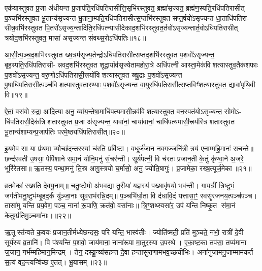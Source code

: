{\anuvakamend[{वसू॑नां भा॒गो॑ऽसि॒ षट्च॑त्वारिशच्च॥९॥}]}

एक॑यास्तुवत प्र॒जा अ॑धीयन्त प्र॒जाप॑ति॒रधि॑पतिरासीत्ति॒सृभि॑रस्तुवत॒ ब्रह्मा॑सृज्यत॒ ब्रह्म॑ण॒स्पति॒रधि॑पतिरासीत् प॒ञ्चभि॑रस्तुवत भू॒तान्य॑सृज्यन्त भू॒ताना॒म्पति॒रधि॑पतिरासीत्स॒प्तभि॑रस्तुवत सप्त॒र्\mbox{}षयो॑ऽसृज्यन्त धा॒ताधि॑पतिरा- सीन्न॒वभि॑रस्तुवत पि॒तरो॑ऽसृज्य॒न्तादि॑ति॒रधि॑पत्न्यासीदेकाद॒शभि॑रस्तुवत॒र्तवो॑ऽसृज्यन्तार्त॒वोऽधि॑पतिरासीत् त्रयोद॒शभि॑रस्तुवत॒ मासा॑ असृज्यन्त संवथ्स॒रोऽधि॑पतिः॥१८॥

आ॒सी॒त्प॒ञ्च॒द॒शभि॑रस्तुवत ख्ष॒त्रम॑सृज्य॒तेन्द्रोऽधि॑पतिरासीत्सप्तद॒शभि॑रस्तुवत प॒शवो॑ऽसृज्यन्त॒ बृह॒स्पति॒रधि॑पतिरासी- न्नवद॒शभि॑रस्तुवत शूद्रा॒र्याव॑सृज्येतामहोरा॒त्रे अधि॑पत्नी आस्ता॒मेक॑विशत्यास्तुव॒तैक॑शफाः प॒शवो॑ऽसृज्यन्त॒ वरु॒णोऽधि॑पतिरासी॒त्त्रयो॑विशत्यास्तुवत ख्षु॒द्राः प॒शवो॑ऽसृज्यन्त पू॒षाधि॑पतिरासी॒त्पञ्च॑विशत्यास्तुवतार॒ण्याः प॒शवो॑ऽसृज्यन्त वा॒युरधि॑पतिरासीत्स॒प्तविꣳ॑शत्यास्तुवत॒ द्यावा॑पृथि॒वी वि॥१९॥

ऐ॒तां॒ वस॑वो रु॒द्रा आ॑दि॒त्या अनु॒ व्या॑य॒न्तेषा॒माधि॑पत्यमासी॒न्नव॑विशत्यास्तुवत॒ वन॒स्पत॑योऽसृज्यन्त॒ सोमोऽ- धि॑पतिरासी॒देक॑त्रिशतास्तुवत प्र॒जा अ॑सृज्यन्त॒ यावा॑नां॒ चाया॑वानां॒ चाधि॑पत्यमासी॒त्त्रय॑स्त्रिशतास्तुवत भू॒तान्य॑शाम्यन्प्र॒जाप॑तिः परमे॒ष्ठ्यधि॑पतिरासीत्॥२०॥

{\anuvakamend[{सं॒ व॒थ्स॒रोऽधि॑पति॒र्वि पञ्च॑त्रिशच्च॥10॥}]}

इ॒यमे॒व सा या प्र॑थ॒मा व्यौच्छ॑द॒न्तर॒स्यां च॑रति॒ प्रवि॑ष्टा। व॒धूर्ज॑जान नव॒गज्जनि॑त्री॒ त्रय॑ एनाम्महि॒मानः॑ सचन्ते॥ छन्द॑स्वती उ॒षसा॒ पेपि॑शाने समा॒नं योनि॒मनु॑ सं॒चर॑न्ती। सूर्य॑पत्नी॒ वि च॑रतः प्रजान॒ती के॒तुं कृ॑ण्वा॒ने अ॒जरे॒ भूरि॑रेतसा॥ ऋ॒तस्य॒ पन्था॒मनु॑ ति॒स्र आगु॒स्त्रयो॑ घ॒र्मासो॒ अनु॒ ज्योति॒षागुः॑। प्र॒जामेका॒ रख्ष॒त्यूर्ज॒मेका॥२१॥

व्र॒तमेका॑ रख्षति देवयू॒नाम्॥ च॒तु॒ष्टो॒मो अ॑भव॒द्या तु॒रीया॑ य॒ज्ञस्य॑ प॒ख्षावृ॑षयो॒ भव॑न्ती। गा॒य॒त्रीं त्रि॒ष्टुभं॒ जग॑तीमनु॒ष्टुभ॑म्बृ॒हद॒र्कं यु॑ञ्जा॒नाः सुव॒राभ॑रन्नि॒दम्॥ प॒ञ्चभि॑र्धा॒ता वि द॑धावि॒दं यत्तासा॒ꣳ॒ स्वसॄ॑रजनय॒त्पञ्च॑पञ्च। तासा॑मु यन्ति प्रय॒वेण॒ पञ्च॒ नाना॑ रू॒पाणि॒ क्रत॑वो॒ वसा॑नाः॥ त्रि॒ꣳ॒शथ्स्वसा॑र॒ उप॑ यन्ति निष्कृ॒त स॑मा॒नं के॒तुम्प्र॑तिमु॒ञ्चमा॑नाः।॥२२॥

ऋ॒तूस्त॑न्वते क॒वयः॑ प्रजान॒तीर्मध्ये॑छन्दसः॒ परि॑ यन्ति॒ भास्व॑तीः। ज्योति॑ष्मती॒ प्रति॑ मुञ्चते॒ नभो॒ रात्री॑ दे॒वी सूर्य॑स्य व्र॒तानि॑। वि प॑श्यन्ति प॒शवो॒ जाय॑माना॒ नाना॑रूपा मा॒तुर॒स्या उ॒पस्थे। ए॒का॒ष्ट॒का तप॑सा॒ तप्य॑माना ज॒जान॒ गर्भ॑म्महि॒मान॒मिन्द्रम्। तेन॒ दस्यू॒न्व्य॑सहन्त दे॒वा ह॒न्तासु॑राणामभव॒च्छची॑भिः। अना॑नुजामनु॒जाम्माम॑कर्त स॒त्यं वद॒न्त्यन्वि॑च्छ ए॒तत्। भू॒यासम्॥२३॥

